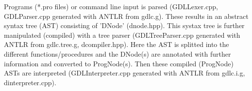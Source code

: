 Programs (*.pro files) or command line input is parsed (GDLLexer.cpp,
GDLParser.cpp generated with ANTLR from gdlc.g). These results in an
abstract syntax tree (AST) consisting of 'DNode' (dnode.hpp).
This systax tree is further manipulated (compiled) with a tree parser
(GDLTreeParser.cpp generated with ANTLR from gdlc.tree.g,
dcompiler.hpp).
Here the AST is splitted into the different functions/procedures and
the DNode(s) are annotated with further information and converted to
ProgNode(s).
Then these compiled (ProgNode) ASTs are interpreted
(GDLInterpreter.cpp generated with ANTLR from gdlc.i.g, dinterpreter.cpp).
